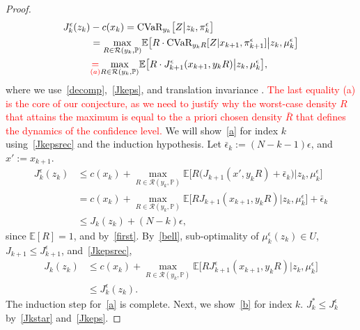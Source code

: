 \documentclass[letterpaper, 10 pt, conference]{ieeeconf}  %
\begin{document}
\begin{proof}
\begin{equation*}
\begin{aligned}
J_k^\epsilon(z_k)& - c(x_k) = \text{CVaR}_{y_k}\big[ Z \big| z_k, \pi_k^\epsilon \big]\\
& = {\underset{R \in \mathcal{R}(y_k, \mathbb{P})}\max}\mathbb{E}\big[ R\cdot \text{CVaR}_{y_k R}[ Z | x_{k+1}, \pi^\epsilon_{k+1} ] \big| z_k, \mu_k^\epsilon \big] \\
& \textcolor{red}{\underset{(a)}{=}} {\underset{R \in \mathcal{R}(y_k, \mathbb{P})}\max}\mathbb{E}\big[ R\cdot J_{k+1}^\epsilon(x_{k+1},y_k R) \big| z_k, \mu_k^\epsilon \big],
\end{aligned}\end{equation*}
%
where we use~\eqref{decomp},~\eqref{Jkeps}, and translation invariance\footnotemark 
{}. \textcolor{red}{The last equality (a) is the core of our conjecture, as we need to justify why the worst-case density $R$ that attains the maximum is equal to the a priori chosen density $\bar{R}$ that defines the dynamics of the confidence level.}
We will show~\eqref{a} for index $k$ using~\eqref{Jkepsrec} and the induction hypothesis. Let $\bar{\epsilon}_k := (N-k-1)\epsilon$, and $x' := x_{k+1}$.
%
\begin{equation*}\begin{aligned}
J_k^\epsilon(z_k) & \leq c(x_k) + {\underset{R \in \mathcal{R}(y_k, \mathbb{P})}\max} \mathbb{E}\big[ R\big(J_{k+1}(x',y_k R) + \bar{\epsilon}_k\big) \big| z_k, \mu_k^\epsilon \big]\\
& = c(x_k) + {\underset{R \in \mathcal{R}(y_k, \mathbb{P})}\max} \mathbb{E}\big[ R J_{k+1}(x_{k+1},y_k R) \big| z_k, \mu_k^\epsilon \big] + \bar{\epsilon}_k\\ 
& \leq J_k(z_k) + (N-k)\epsilon,
\end{aligned}\end{equation*}
%
since $\mathbb{E}[R] = 1$, and by~\eqref{first}. By~\eqref{bell}, sub-optimality of $\mu_k^\epsilon(z_k) \in U$, $J_{k+1} \leq J^\epsilon_{k+1}$, and~\eqref{Jkepsrec},
%
\begin{equation*}\begin{aligned}
J_k(z_k) & \leq c(x_k) + {\underset{R \in \mathcal{R}(y_k, \mathbb{P})}\max} \mathbb{E}\big[ R J^\epsilon_{k+1}(x_{k+1},y_k R) \big| z_k, \mu_k^\epsilon \big]\\
& \leq J_k^\epsilon(z_k). \end{aligned}\end{equation*}
%
The induction step for~\eqref{a} is complete. Next, we show~\eqref{b} for index $k$. $J_k^* \leq J_k^\epsilon$ by~\eqref{Jkstar} and~\eqref{Jkeps}.

\end{proof}
\end{document}
